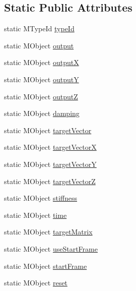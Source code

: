 \subsection*{Static Public Attributes}
\begin{DoxyCompactItemize}
\item 
static M\-Type\-Id \hyperlink{class_m_g__jiggle_vector_a5b2ebd5c51fb61ac246737c2871da7e7}{type\-Id}
\item 
static M\-Object \hyperlink{class_m_g__jiggle_vector_ada4c47f0dc60de027fe146bc1bf991f1}{output}
\item 
static M\-Object \hyperlink{class_m_g__jiggle_vector_a8165d97e3ab365d18a77af35ec9bd9d6}{output\-X}
\item 
static M\-Object \hyperlink{class_m_g__jiggle_vector_aa19e7d9b0b5f5f2066186a2106be7cb6}{output\-Y}
\item 
static M\-Object \hyperlink{class_m_g__jiggle_vector_a774f838b90e3bc2b823cffd43636ff43}{output\-Z}
\item 
static M\-Object \hyperlink{class_m_g__jiggle_vector_ab8ca0ac264688ec4588a06dc2de254d0}{damping}
\item 
static M\-Object \hyperlink{class_m_g__jiggle_vector_a9efc733e10f8b37b8ab5778c558d4668}{target\-Vector}
\item 
static M\-Object \hyperlink{class_m_g__jiggle_vector_aa16f19dc9c8b90569fdf39bfd6c9fd9e}{target\-Vector\-X}
\item 
static M\-Object \hyperlink{class_m_g__jiggle_vector_a075829bfac84e90a655e09dbf025e04f}{target\-Vector\-Y}
\item 
static M\-Object \hyperlink{class_m_g__jiggle_vector_aa1755e674e4bb7b580cf671eda0972b5}{target\-Vector\-Z}
\item 
static M\-Object \hyperlink{class_m_g__jiggle_vector_a41ea7a211dd0a1b21dd425aa39f3e358}{stiffness}
\item 
static M\-Object \hyperlink{class_m_g__jiggle_vector_a015c3c6cc0881e95de079788971e1f58}{time}
\item 
static M\-Object \hyperlink{class_m_g__jiggle_vector_a6e7dbbc9a06941e0b932b71e31050e32}{target\-Matrix}
\item 
static M\-Object \hyperlink{class_m_g__jiggle_vector_a680e0c72b6b00e9f828e441302753058}{use\-Start\-Frame}
\item 
static M\-Object \hyperlink{class_m_g__jiggle_vector_a2ffb1a14f9ead468f8dcf00df6c35652}{start\-Frame}
\item 
static M\-Object \hyperlink{class_m_g__jiggle_vector_a215dfaa566c1c46b1b248704298e588a}{reset}

\end{DoxyCompactItemize}
